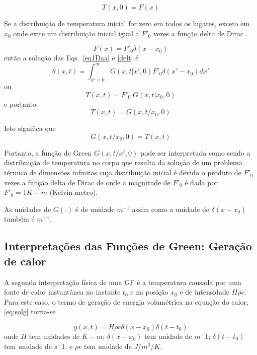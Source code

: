 \begin{equation}\label{eq1Dbb}
    T(x,0) = F(x)
\end{equation}

Se a distribuição de temperatura inicial for zero em todos os lugares, exceto em $x_0$ onde
exite um distribuição inicial igual a $F'_0$ vezes a função delta de Dirac .

\begin{equation}\label{delt}
    F(x) = F'_0 \delta(x-x_0)
\end{equation}
então a solução das Eqs.~\ref{eq1Daa} e \ref{delt} é
\begin{equation}\label{eq:solTi}
    \displaystyle \theta(x,t) = \int_{x'=0}^{\infty} G(x,t|x',0) F'_0 \delta(x'-x_0)dx'
\end{equation}
ou
\begin{equation}\label{deltfx}
	T(x,t) = F'_0 \; G(x,t|x_0,0)
\end{equation}
e portanto
\begin{equation}\label{deltfx1}
	T(x,t) = G(x,t/x_0,0)
\end{equation}

Isto significa que
\begin{equation}\label{deltfx2}
	G(x,t/x_0,0) =	T(x,t)
\end{equation}


Portanto, a função de Green $G(x,t/x',0)$ pode ser interpretada como sendo a distribuição de temperatura no corpo que resulta da solução de  um problema térmico de dimensões infinitas cuja distribuição inicial é devido o produto de $F'_0$ vezes a função delta de Dirac de onde a magnitude de $F'_0$ é dada por $F'_0= 1 K-m$ (Kelvin-metro). 

As unidades de $G(.)$ é de unidade  $m^{-1}$ assim como a unidade de $\delta(x-x_0)$ também é $m^{-1}$.

\subsection{Interpretações das Funções de Green: Geração de calor}
A segunda interpretação física de uma GF é a temperatura causada por uma fonte de calor instantânea no instante $t_0$ e na posição $x_0$ e de intensidade $H\rho c$.
Para este caso, o termo de geração de energia volumétrica na equação do calor, \ref{eq:solg} torna-se

\begin{equation}\label{deltfx3}
    g(x,t) = H \rho c \delta(x-x_0) \delta(t-t_0)
\end{equation}
onde $H$ tem unidades de $K-m$; $\delta (x-x_0)$ tem unidade de $m^-1$; $\delta(t-t_0)$ tem unidade de $s^-1$; e $\rho c$ tem unidade de $J/m^3/K$.

